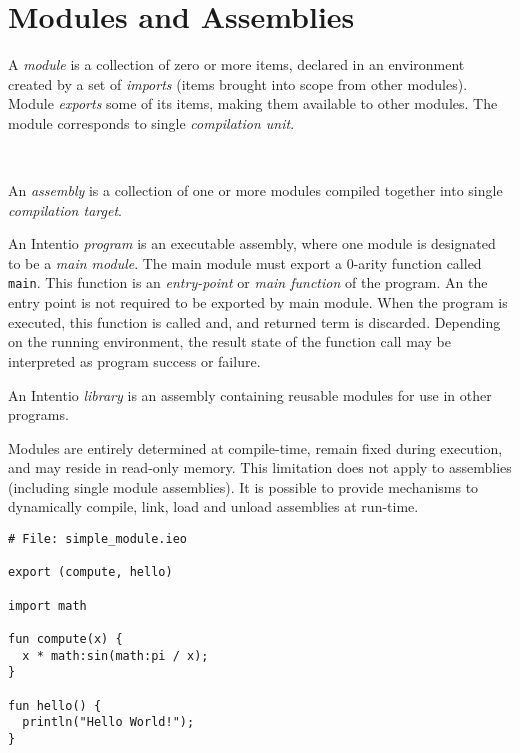 \chapter{Modules and Assemblies}

A \emph{module} is a collection of zero or more items, declared in an environment created by a set of \emph{imports} (items brought into scope from other modules). Module \emph{exports} some of its items, making them available to other modules. The module corresponds to single \emph{compilation unit}.

\begin{bnf}
   \eq {} \ 
\end{bnf}

An \emph{assembly} is a collection of one or more modules compiled together into single \emph{compilation target}.

An Intentio \emph{program} is an executable assembly, where one module is designated to be a \emph{main module}. The main module must export a 0-arity function called \lstinline{main}. This function is an \emph{entry-point} or \emph{main function} of the program. An the entry point is not required to be exported by main module. When the program is executed, this function is called and, and returned term is discarded. Depending on the running environment, the result state of  the function call may be interpreted as program success or failure.

An Intentio \emph{library} is an assembly containing reusable modules for use in other programs.

Modules are entirely determined at compile-time, remain fixed during execution, and may reside in read-only memory. This limitation does not apply to assemblies (including single module assemblies). It is possible to provide mechanisms to dynamically compile, link, load and unload assemblies at run-time.

\begin{example}
\begin{lstlisting}[language=intentio]
# File: simple_module.ieo

export (compute, hello)

import math

fun compute(x) {
  x * math:sin(math:pi / x);
}

fun hello() {
  println("Hello World!");
}
\end{lstlisting}
\end{example}

